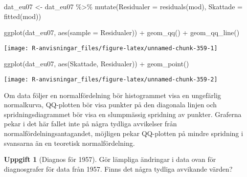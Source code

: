 \documentclass[
]{book}
\newenvironment{Shaded}{\begin{snugshade}}{\end{snugshade}}
\newcommand{\AttributeTok}[1]{\textcolor[rgb]{0.77,0.63,0.00}{#1}}
\newcommand{\FunctionTok}[1]{\textcolor[rgb]{0.00,0.00,0.00}{#1}}
\newcommand{\NormalTok}[1]{#1}
\newcommand{\OtherTok}[1]{\textcolor[rgb]{0.56,0.35,0.01}{#1}}
\newcommand{\SpecialCharTok}[1]{\textcolor[rgb]{0.00,0.00,0.00}{#1}}
\theoremstyle{definition}
\theoremstyle{definition}
\theoremstyle{definition}
\newtheorem{exercise}{Uppgift}[chapter]
\theoremstyle{definition}
\theoremstyle{remark}
\begin{document}
\begin{Shaded}
\begin{Highlighting}[]
\NormalTok{dat\_eu07 }\OtherTok{\textless{}{-}}\NormalTok{ dat\_eu07 }\SpecialCharTok{\%\textgreater{}\%} 
  \FunctionTok{mutate}\NormalTok{(}\AttributeTok{Residualer =} \FunctionTok{residuals}\NormalTok{(mod),}
         \AttributeTok{Skattade =} \FunctionTok{fitted}\NormalTok{(mod))}

\FunctionTok{ggplot}\NormalTok{(dat\_eu07, }\FunctionTok{aes}\NormalTok{(}\AttributeTok{sample =}\NormalTok{ Residualer)) }\SpecialCharTok{+} \FunctionTok{geom\_qq}\NormalTok{() }\SpecialCharTok{+} \FunctionTok{geom\_qq\_line}\NormalTok{()}
\end{Highlighting}
\end{Shaded}

\begin{center}\texttt{[image: R-anvisningar\_files/figure-latex/unnamed-chunk-359-1]} \end{center}

\begin{Shaded}
\begin{Highlighting}[]
\FunctionTok{ggplot}\NormalTok{(dat\_eu07, }\FunctionTok{aes}\NormalTok{(Skattade, Residualer)) }\SpecialCharTok{+} \FunctionTok{geom\_point}\NormalTok{()}
\end{Highlighting}
\end{Shaded}

\begin{center}\texttt{[image: R-anvisningar\_files/figure-latex/unnamed-chunk-359-2]} \end{center}

Om data följer en normalfördelning bör histogrammet visa en ungefärlig normalkurva, QQ-plotten bör visa punkter på den diagonala linjen och spridningsdiagrammet bör visa en slumpmässig spridning av punkter. Graferna pekar i det här fallet inte på några tydliga avvikelser från normalfördelningsantagandet, möjligen pekar QQ-plotten på mindre spridning i svansarna än en teoretisk normalfördelning.

\begin{exercise}[Diagnos för 1957]
Gör lämpliga ändringar i data ovan för diagnosgrafer för data från 1957. Finns det några tydliga avvikande värden?
\end{exercise}
\end{document}
